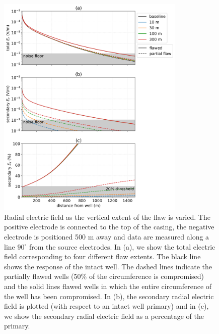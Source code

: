 \begin{figure}
    \begin{center}
    \includegraphics[width=0.8\textwidth]{figures/integrity_partial_flaw.png}
    \end{center}
\caption{
    Radial electric field as the vertical extent of the flaw is varied.
    The positive electrode is connected to the top of the casing, the negative electrode
    is positioned 500 m away and data are measured along a line $90^\circ$ from the
    source electrodes. In (a), we show the total electric field corresponding to four different flaw extents.
    The black line shows the response of the intact well.
    The dashed lines indicate the partially flawed wells (50\% of the circumference is compromised)
    and the solid lines flawed wells in which the entire circumference of the well has been compromised.
    In (b), the secondary radial electric field is plotted (with respect to an intact well primary)
    and in (c), we show the secondary radial electric field as a percentage of the primary.
}
\label{fig:integrity_partial_flaw}
\end{figure}

